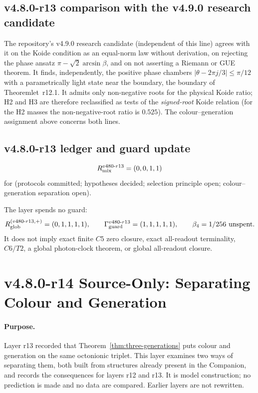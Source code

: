 \subsection*{v4.8.0-r13 comparison with the v4.9.0 research candidate}
\label{subsec:v480-r13-v49}

The repository's v4.9.0 research candidate (independent of this line) agrees with it on the Koide condition as an
equal-norm law without derivation, on rejecting the phase ansatz \(\pi-\sqrt2\arcsin\beta\), and on not
asserting a Riemann or GUE theorem.  It finds, independently, the positive phase chambers
\(|\theta-2\pi j/3|\le\pi/12\) with a parametrically light state near the boundary, the boundary of
Theoremlet~r12.1.  It admits only non-negative roots for the physical Koide ratio; H2 and H3 are therefore
reclassified as tests of the \emph{signed-root} Koide relation (for the H2 masses the non-negative-root ratio is
\(0.525\)).  The colour--generation assignment above concerns both lines.

\subsection*{v4.8.0-r13 ledger and guard update}
\label{subsec:v480-r13-ledger-guard}

\[
R_{\rm mix}^{v480\text{-}r13}=(0,0,1,1)
\]
for (protocols committed; hypotheses decided; selection principle open; colour--generation separation open).

The layer spends no guard:
\[
R_{\rm glob}^{(v480\text{-}r13,+)}=(0,1,1,1,1),
\qquad
\Gamma_{\rm guard}^{v480\text{-}r13}=(1,1,1,1,1),
\qquad
\beta_4=1/256\ \text{unspent}.
\]
It does not imply exact finite \(C5\) zero closure, exact all-readout terminality,
\(C6/T2\), a global photon-clock theorem, or global all-readout closure.

\clearpage
\section*{v4.8.0-r14 Source-Only: Separating Colour and Generation}
\label{sec:v480-r14-colour-generation}

\paragraph{Purpose.}
Layer r13 recorded that Theorem~\ref{thm:three-generations} puts colour and generation on the same octonionic
triplet.  This layer examines two ways of separating them, both built from structures already present in the
Companion, and records the consequences for layers r12 and r13.  It is model construction; no prediction is made
and no data are compared.  Earlier layers are not rewritten.


